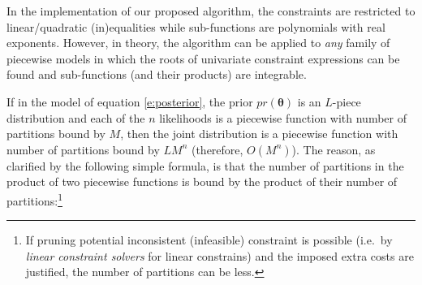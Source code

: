 In the implementation of our proposed algorithm, the constraints are restricted to linear/quadratic (in)equalities while sub-functions are polynomials with real exponents. %
However, in theory, the algorithm can be applied to \emph{any} family of piecewise models in which the roots of univariate constraint expressions can be found and sub-functions (and their products) are integrable. 


If in the model of equation \ref{e:posterior}, the prior $pr(\boldsymbol\theta)$ 
is an $L$-piece distribution and each of the $n$ likelihoods is a piecewise function with number of partitions  bound by $M$, 
then the joint distribution is a piecewise function with number of partitions bound by $LM^n$ (therefore, $O(M^n)$).
The reason, as clarified by the following simple formula,   
is that the number of partitions in the product of two piecewise functions is bound by the product of their number of partitions:\footnote{
If pruning potential inconsistent (infeasible) constraint is possible
(i.e.\ by \emph{linear constraint solvers} for linear constrains) and the imposed extra costs are justified,
the number of partitions can be less.
}%

